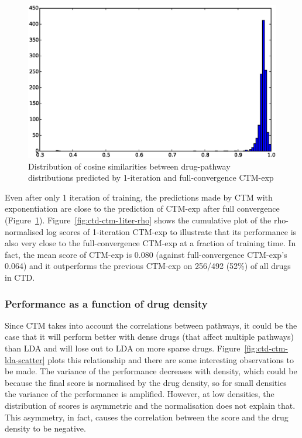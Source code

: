 \documentclass[12pt,a4paper,twoside,openright]{report}
\begin{document}
\begin{figure}[!htb]
\includegraphics[width=\textwidth]{ctd-ctm-1iter-hist.eps}
\caption{Distribution of cosine similarities between drug-pathway distributions predicted by 1-iteration and full-convergence CTM-exp}
\label{fig:ctd-ctm-1iter-hist}
\end{figure}

Even after only 1 iteration of training, the predictions made by CTM with exponentiation are close to the prediction of CTM-exp after full convergence (Figure~\ref{fig:ctd-ctm-1iter-hist}). Figure~\ref{fig:ctd-ctm-1iter-rho} shows the cumulative plot of the rho-normalised log scores of 1-iteration CTM-exp to illustrate that its performance is also very close to the full-convergence CTM-exp at a fraction of training time. In fact, the mean score of CTM-exp is 0.080 (against full-convergence CTM-exp's 0.064) and it outperforms the previous CTM-exp on 256/492 (52\%) of all drugs in CTD.

\subsubsection{Performance as a function of drug density}

Since CTM takes into account the correlations between pathways, it could be the case that it will perform better with dense drugs (that affect multiple pathways) than LDA and will lose out to LDA on more sparse drugs. Figure~\ref{fig:ctd-ctm-lda-scatter} plots this relationship and there are some interesting observations to be made. The variance of the performance decreases with density, which could be because the final score is normalised by the drug density, so for small densities the variance of the performance is amplified. However, at low densities, the distribution of scores is asymmetric and the normalisation does not explain that. This asymmetry, in fact, causes the correlation between the score and the drug density to be negative.
\end{document}
